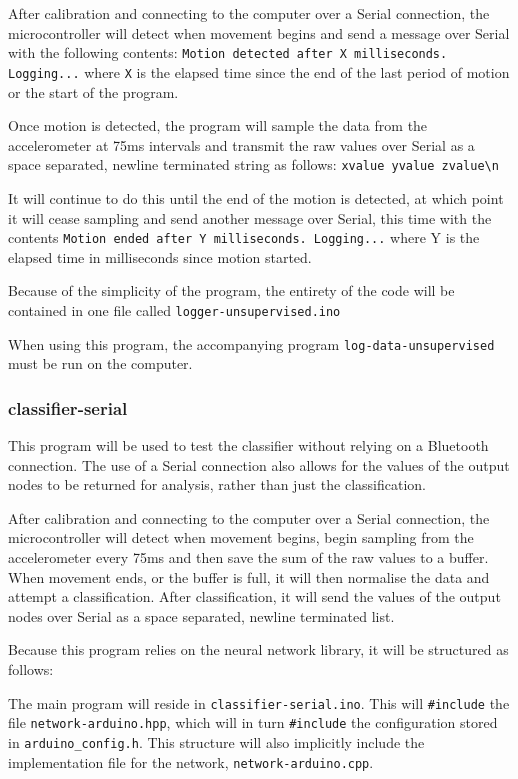 \documentclass[a4paper]{article}
\begin{document}
After calibration and connecting to the computer over a Serial connection, the microcontroller will detect when movement begins and send a message over Serial with the following contents: \lstinline{Motion detected after X milliseconds. Logging...} where \lstinline{X} is the elapsed time since the end of the last period of motion or the start of the program.

Once motion is detected, the program will sample the data from the accelerometer at 75ms intervals and transmit the raw values over Serial as a space separated, newline terminated string as follows:
\lstinline|xvalue yvalue zvalue\n|

It will continue to do this until the end of the motion is detected, at which point it will cease sampling and send another message over Serial, this time with the contents \lstinline{Motion ended after Y milliseconds. Logging...} where Y is the elapsed time in milliseconds since motion started.

Because of the simplicity of the program, the entirety of the code will be contained in one file called \lstinline{logger-unsupervised.ino}

When using this program, the accompanying program \lstinline{log-data-unsupervised} must be run on the computer. 

\subsubsection{classifier-serial}

This program will be used to test the classifier without relying on a Bluetooth connection. The use of a Serial connection also allows for the values of the output nodes to be returned for analysis, rather than just the classification.

After calibration and connecting to the computer over a Serial connection, the microcontroller will detect when movement begins, begin sampling from the accelerometer every 75ms and then save the sum of the raw values to a buffer. When movement ends, or the buffer is full, it will then normalise the data and attempt a classification. After classification, it will send the values of the output nodes over Serial as a space separated, newline terminated list.

Because this program relies on the neural network library, it will be structured as follows:

The main program will reside in \lstinline{classifier-serial.ino}. This will \lstinline{#include} the file \lstinline{network-arduino.hpp}, which will in turn \lstinline{#include} the configuration stored in \lstinline{arduino_config.h}. 
This structure will also implicitly include the implementation file for the network, \lstinline{network-arduino.cpp}.
\end{document}
